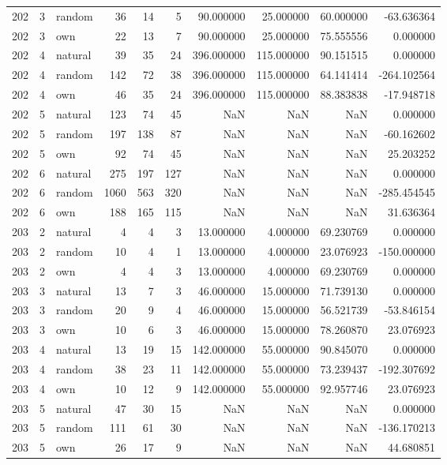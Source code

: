 \begin{table}[htbp]
\begin{tabular}{rrlrrrrrrr}
202 & 3 & random & 36 & 14 & 5 & 90.000000 & 25.000000 & 60.000000 & -63.636364 \\
202 & 3 & own & 22 & 13 & 7 & 90.000000 & 25.000000 & 75.555556 & 0.000000 \\
202 & 4 & natural & 39 & 35 & 24 & 396.000000 & 115.000000 & 90.151515 & 0.000000 \\
202 & 4 & random & 142 & 72 & 38 & 396.000000 & 115.000000 & 64.141414 & -264.102564 \\
202 & 4 & own & 46 & 35 & 24 & 396.000000 & 115.000000 & 88.383838 & -17.948718 \\
202 & 5 & natural & 123 & 74 & 45 & NaN & NaN & NaN & 0.000000 \\
202 & 5 & random & 197 & 138 & 87 & NaN & NaN & NaN & -60.162602 \\
202 & 5 & own & 92 & 74 & 45 & NaN & NaN & NaN & 25.203252 \\
202 & 6 & natural & 275 & 197 & 127 & NaN & NaN & NaN & 0.000000 \\
202 & 6 & random & 1060 & 563 & 320 & NaN & NaN & NaN & -285.454545 \\
202 & 6 & own & 188 & 165 & 115 & NaN & NaN & NaN & 31.636364 \\
203 & 2 & natural & 4 & 4 & 3 & 13.000000 & 4.000000 & 69.230769 & 0.000000 \\
203 & 2 & random & 10 & 4 & 1 & 13.000000 & 4.000000 & 23.076923 & -150.000000 \\
203 & 2 & own & 4 & 4 & 3 & 13.000000 & 4.000000 & 69.230769 & 0.000000 \\
203 & 3 & natural & 13 & 7 & 3 & 46.000000 & 15.000000 & 71.739130 & 0.000000 \\
203 & 3 & random & 20 & 9 & 4 & 46.000000 & 15.000000 & 56.521739 & -53.846154 \\
203 & 3 & own & 10 & 6 & 3 & 46.000000 & 15.000000 & 78.260870 & 23.076923 \\
203 & 4 & natural & 13 & 19 & 15 & 142.000000 & 55.000000 & 90.845070 & 0.000000 \\
203 & 4 & random & 38 & 23 & 11 & 142.000000 & 55.000000 & 73.239437 & -192.307692 \\
203 & 4 & own & 10 & 12 & 9 & 142.000000 & 55.000000 & 92.957746 & 23.076923 \\
203 & 5 & natural & 47 & 30 & 15 & NaN & NaN & NaN & 0.000000 \\
203 & 5 & random & 111 & 61 & 30 & NaN & NaN & NaN & -136.170213 \\
203 & 5 & own & 26 & 17 & 9 & NaN & NaN & NaN & 44.680851 \\

\end{tabular}
\end{table}
